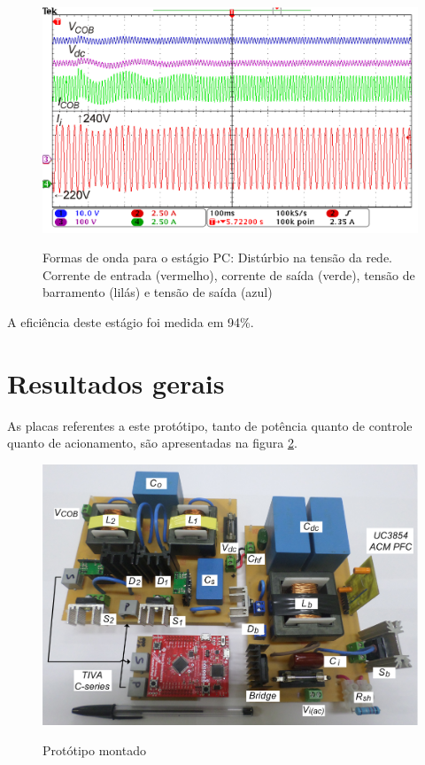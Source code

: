 \documentclass[
        12pt,
        openany, %
        oneside, %
        a4paper,			
        english,			
        brazil
        ]{abntbibufjf}
\begin{document}
\begin{figure}[!h]
	\centering
	\caption{Formas de onda para o estágio PC: Distúrbio na tensão da rede. Corrente de entrada (vermelho), corrente de saída (verde), tensão de barramento (lilás) e tensão de saída (azul)}
	\includegraphics[width=0.7\linewidth]{../FIGURAS/Figuras_TFC_Eric/Formas_de_onda/Detailed_220V_to_240V}
	\label{pc_wav_2}
\end{figure}


A eficiência deste estágio foi medida em 94\%.




\section{Resultados gerais}

As placas referentes a este protótipo, tanto de potência quanto de controle quanto de acionamento, são apresentadas na figura \ref{pc_pfc_proto}.

\begin{figure}[!h]
	\centering
	\caption{Protótipo montado}
	\includegraphics[width=0.7\linewidth]{../FIGURAS/Figuras_TFC_Eric/Figuras/Prototipo_ACM-EGIBC.png}
	\label{pc_pfc_proto}
\end{figure}
\end{document}
